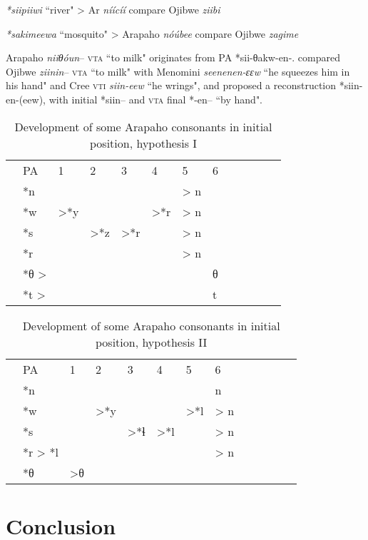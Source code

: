 \documentclass[twoside,a4paper,11pt]{article}
\newcommand{\ipa}[1]{{\phon\textit{#1}}}
\newcommand{\grise}[1]{\cellcolor{lightgray}\textbf{#1}}
\newcommand{\Σ}{\greek{Σ}}
\begin{document}
 \ipa{*siipiiwi} ``river" >  Ar \ipa{níícíí}   compare Ojibwe \ipa{ziibi}

\ipa{*sakimeewa} ``mosquito" > Arapaho \ipa{nóúbee}  compare Ojibwe \ipa{zagime}

 
Arapaho \textit{niiθóun}-- \textsc{vta} ``to milk" originates from PA *sii-θakw-en-.   \citet{hewson93proto} compared  Ojibwe \textit{ziinin}-- \textsc{vta} ``to milk" with Menomini \textit{seenenen-ɛɛw} ``he squeezes him in his hand" and Cree \textsc{vti} \textit{siin-eew} ``he wrings", and proposed a reconstruction *siin-en-(eew), with initial *siin-- and \textsc{vta} final *-en-- ``by hand". 

\citealt{jacques13arapaho}
\citealt{pentland98}

\begin{table}[H]
\caption{Development of some Arapaho  consonants in initial position, hypothesis I}  \centering
\begin{tabular}{lllllllllllll}
&PA & 1 & 2 & 3 & 4 & 5 & 6 & \\
&*n   &&&&& > n\\
&*w   & >*y  \grise{} & \grise{} & \grise{}  &>*r	  \grise{} &> n \grise{}\\
&*s  &  &>*z &>*r	 \grise{}& 	 \grise{} &> n \grise{}\\
&*r	   & 	&  & 	& 	  &> n \grise{}\\
&*θ >  & &&&&&θ \\
&*t > & &&&&&t \\
\end{tabular}
\end{table}


\begin{table}[H]
\caption{Development of some Arapaho   consonants in initial position, hypothesis II}   \centering
\begin{tabular}{lllllllllllll}
&PA & 1 & 2 & 3 & 4 & 5 & 6   \\
&*n  &&&&&& n\\
&*w   && >*y  \grise{}   & \grise{}& \grise{}   &>*l \grise{} &> n \grise{}\\
&*s  && &  >*ɬ  &>*l \grise{}&  \grise{} & > n \grise{}\\
&*r > *l	 &  &  &    &  &    &> n \grise{}\\
&*θ  &  >θ\\
\end{tabular}
\end{table}


\section{Conclusion}	


 
 
\end{document}

